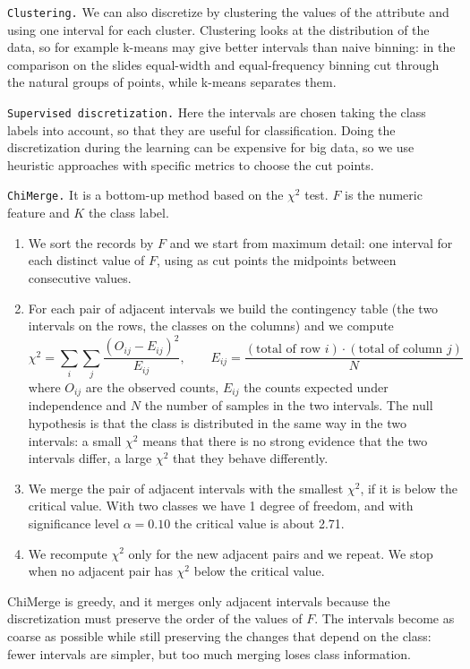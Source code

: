 \texttt{Clustering.} We can also discretize by clustering the values of the attribute and using one interval for each cluster. Clustering looks at the distribution of the data, so for example k-means may give better intervals than naive binning: in the comparison on the slides equal-width and equal-frequency binning cut through the natural groups of points, while k-means separates them.

\texttt{Supervised discretization.} Here the intervals are chosen taking the class labels into account, so that they are useful for classification. Doing the discretization during the learning can be expensive for big data, so we use heuristic approaches with specific metrics to choose the cut points.

\texttt{ChiMerge.} It is a bottom-up method based on the $\chi^2$ test. $F$ is the numeric feature and $K$ the class label.
\begin{enumerate}
    \item We sort the records by $F$ and we start from maximum detail: one interval for each distinct value of $F$, using as cut points the midpoints between consecutive values.
    \item For each pair of adjacent intervals we build the contingency table (the two intervals on the rows, the classes on the columns) and we compute
    \[
        \chi^2 = \sum_{i}\sum_{j}\frac{(O_{ij}-E_{ij})^2}{E_{ij}}, \qquad E_{ij} = \frac{(\text{total of row } i)\cdot(\text{total of column } j)}{N}
    \]
    where $O_{ij}$ are the observed counts, $E_{ij}$ the counts expected under independence and $N$ the number of samples in the two intervals. The null hypothesis is that the class is distributed in the same way in the two intervals: a small $\chi^2$ means that there is no strong evidence that the two intervals differ, a large $\chi^2$ that they behave differently.
    \item We merge the pair of adjacent intervals with the smallest $\chi^2$, if it is below the critical value. With two classes we have 1 degree of freedom, and with significance level $\alpha=0.10$ the critical value is about 2.71.
    \item We recompute $\chi^2$ only for the new adjacent pairs and we repeat. We stop when no adjacent pair has $\chi^2$ below the critical value.
\end{enumerate}
ChiMerge is greedy, and it merges only adjacent intervals because the discretization must preserve the order of the values of $F$. The intervals become as coarse as possible while still preserving the changes that depend on the class: fewer intervals are simpler, but too much merging loses class information.

